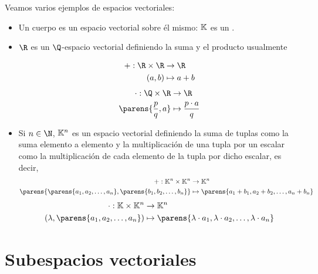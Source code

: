 \documentclass[../algebra_lineal.tex]{subfiles}
\begin{document}
\begin{example}
    Veamos varios ejemplos de espacios vectoriales:
    \begin{itemize}
        \item Un cuerpo es un espacio vectorial sobre él mismo: $\mathbb{K}$ es un \kvspace.
        \item $\R$ es un $\Q$-espacio vectorial definiendo la suma y el producto usualmente
        
        \begin{multicols}{2}            
            \noindent\begin{align*}
                +: \R \times \R &\to \R \\
                    (a, b) &\mapsto a+b
            \end{align*}
            \begin{align*}
                \cdot: \Q \times \R &\to \R \\
                    \parens{\frac{p}{q}, a} &\mapsto \frac{p \cdot a}{q}
            \end{align*}
        \end{multicols}

        \item Si $n \in \N$, $\mathbb{K}^n$ es un espacio vectorial definiendo la suma de tuplas como la suma elemento a elemento y la multiplicación de una tupla por un escalar como la multiplicación de cada elemento de la tupla por dicho escalar, es decir,
        \begin{align*} +: \K^n \times \K^n &\to \K^n \\
                \parens{\parens{\dlst{a}{n}}, \parens{\dlst{b}{n}}} &\mapsto \parens{a_1+b_1, a_2+b_2, \dots, a_n+b_n}
        \end{align*}
        \begin{align*}
            \cdot: \K \times \K^n &\to \K^n \\
                (\lambda, \parens{\dlst{a}{n}}) &\mapsto \parens{\lambda \cdot a_1, \lambda \cdot a_2, \dots, \lambda \cdot  a_n}
        \end{align*}

    \end{itemize}
\end{example}

\section{Subespacios vectoriales}
\end{document}
